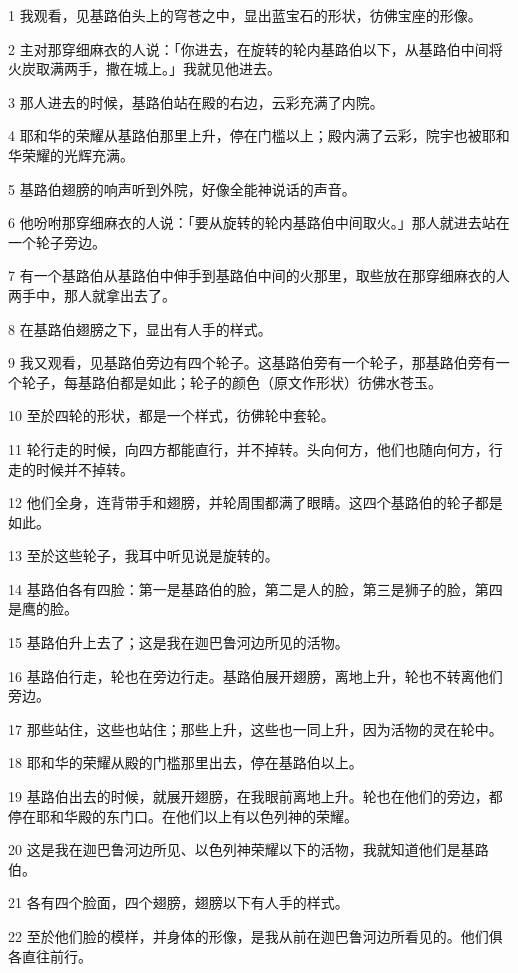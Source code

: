 \par 1 我观看，见基路伯头上的穹苍之中，显出蓝宝石的形状，彷佛宝座的形像。
\par 2 主对那穿细麻衣的人说：「你进去，在旋转的轮内基路伯以下，从基路伯中间将火炭取满两手，撒在城上。」我就见他进去。
\par 3 那人进去的时候，基路伯站在殿的右边，云彩充满了内院。
\par 4 耶和华的荣耀从基路伯那里上升，停在门槛以上；殿内满了云彩，院宇也被耶和华荣耀的光辉充满。
\par 5 基路伯翅膀的响声听到外院，好像全能神说话的声音。
\par 6 他吩咐那穿细麻衣的人说：「要从旋转的轮内基路伯中间取火。」那人就进去站在一个轮子旁边。
\par 7 有一个基路伯从基路伯中伸手到基路伯中间的火那里，取些放在那穿细麻衣的人两手中，那人就拿出去了。
\par 8 在基路伯翅膀之下，显出有人手的样式。
\par 9 我又观看，见基路伯旁边有四个轮子。这基路伯旁有一个轮子，那基路伯旁有一个轮子，每基路伯都是如此；轮子的颜色（原文作形状）彷佛水苍玉。
\par 10 至於四轮的形状，都是一个样式，彷佛轮中套轮。
\par 11 轮行走的时候，向四方都能直行，并不掉转。头向何方，他们也随向何方，行走的时候并不掉转。
\par 12 他们全身，连背带手和翅膀，并轮周围都满了眼睛。这四个基路伯的轮子都是如此。
\par 13 至於这些轮子，我耳中听见说是旋转的。
\par 14 基路伯各有四脸：第一是基路伯的脸，第二是人的脸，第三是狮子的脸，第四是鹰的脸。
\par 15 基路伯升上去了；这是我在迦巴鲁河边所见的活物。
\par 16 基路伯行走，轮也在旁边行走。基路伯展开翅膀，离地上升，轮也不转离他们旁边。
\par 17 那些站住，这些也站住；那些上升，这些也一同上升，因为活物的灵在轮中。
\par 18 耶和华的荣耀从殿的门槛那里出去，停在基路伯以上。
\par 19 基路伯出去的时候，就展开翅膀，在我眼前离地上升。轮也在他们的旁边，都停在耶和华殿的东门口。在他们以上有以色列神的荣耀。
\par 20 这是我在迦巴鲁河边所见、以色列神荣耀以下的活物，我就知道他们是基路伯。
\par 21 各有四个脸面，四个翅膀，翅膀以下有人手的样式。
\par 22 至於他们脸的模样，并身体的形像，是我从前在迦巴鲁河边所看见的。他们俱各直往前行。

